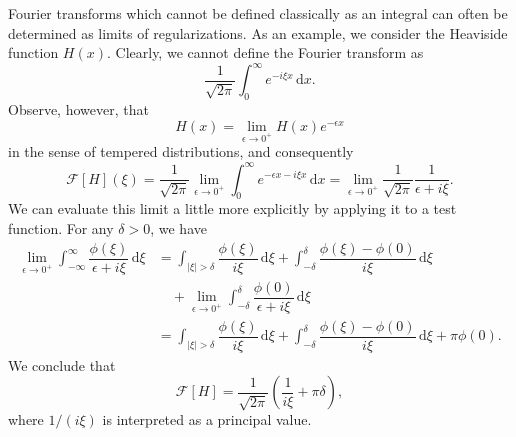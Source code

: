 \begin{Example}
\label{ex:fourier-heaviside-regularization}
Fourier transforms which cannot be defined classically as an integral can often be determined as limits of regularizations. As an example, we consider the Heaviside function $H(x)$. Clearly, we cannot define the Fourier transform as
\begin{equation}\label{eq:heaviside-nonconvergent-fourier-integral}
\dfrac1{\sqrt{2\pi}}\int_0^\infty e^{-i\xi x}\,\mathrm{d}x.
\end{equation}
Observe, however, that
\begin{equation}\label{eq:heaviside-exponential-regularization}
H(x)=\lim_{\epsilon\to0^+}H(x)e^{-\epsilon x}
\end{equation}
in the sense of tempered distributions, and consequently
\begin{equation}\label{eq:heaviside-fourier-regularized-limit}
\mathcal{F}[H](\xi)=\dfrac1{\sqrt{2\pi}}\lim_{\epsilon\to0^+}\int_0^\infty e^{-\epsilon x-i\xi x}\,\mathrm{d}x=\lim_{\epsilon\to0^+}\dfrac1{\sqrt{2\pi}}\dfrac1{\epsilon+i\xi}.
\end{equation}
We can evaluate this limit a little more explicitly by applying it to a test function. For any $\delta>0$, we have
\begin{equation}\label{eq:heaviside-fourier-principal-value-limit}
\begin{aligned}
\lim_{\epsilon\to0^+}\int_{-\infty}^\infty\dfrac{\phi(\xi)}{\epsilon+i\xi}\,\mathrm{d}\xi
&=\int_{|\xi|>\delta}\dfrac{\phi(\xi)}{i\xi}\,\mathrm{d}\xi
+\int_{-\delta}^{\delta}\dfrac{\phi(\xi)-\phi(0)}{i\xi}\,\mathrm{d}\xi\\
&\quad+\lim_{\epsilon\to0^+}\int_{-\delta}^{\delta}\dfrac{\phi(0)}{\epsilon+i\xi}\,\mathrm{d}\xi\\
&=\int_{|\xi|>\delta}\dfrac{\phi(\xi)}{i\xi}\,\mathrm{d}\xi
+\int_{-\delta}^{\delta}\dfrac{\phi(\xi)-\phi(0)}{i\xi}\,\mathrm{d}\xi+\pi\phi(0).
\end{aligned}
\end{equation}
We conclude that
\begin{equation}\label{eq:heaviside-fourier-principal-value-formula}
\mathcal{F}[H]=\dfrac1{\sqrt{2\pi}}\left(\dfrac1{i\xi}+\pi\delta\right),
\end{equation}
where $1/(i\xi)$ is interpreted as a principal value.
\end{Example}

